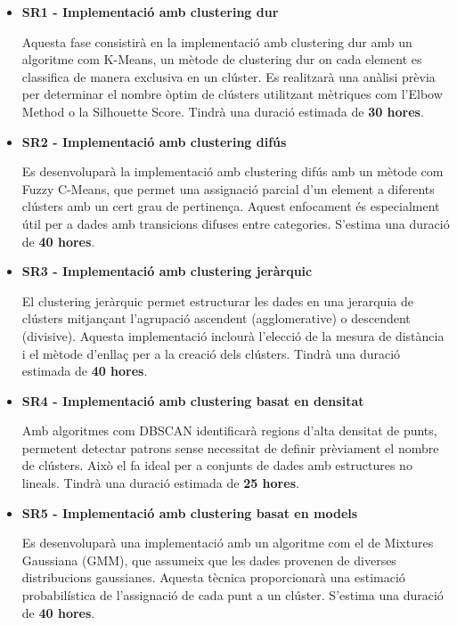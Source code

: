 \documentclass[a4paper,12pt]{report}
\begin{document}
\begin{itemize}
    \item \textbf{SR1 - Implementació amb clustering dur}
    
    Aquesta fase consistirà en la implementació amb clustering dur amb un algoritme com K-Means, un mètode de clustering dur on cada element es classifica de manera exclusiva en un clúster.
    Es realitzarà una anàlisi prèvia per determinar el nombre òptim de clústers utilitzant mètriques com l'Elbow Method o la Silhouette Score.
    Tindrà una duració estimada de \textbf{30 hores}.

    \item \textbf{SR2 - Implementació amb clustering difús}
    
    Es desenvoluparà la implementació amb clustering difús amb un mètode com Fuzzy C-Means, que permet una assignació parcial d'un element a diferents clústers amb un cert grau de pertinença.
    Aquest enfocament és especialment útil per a dades amb transicions difuses entre categories.
    S'estima una duració de \textbf{40 hores}.

    \item \textbf{SR3 - Implementació amb clustering jeràrquic}
    
    El clustering jeràrquic permet estructurar les dades en una jerarquia de clústers mitjançant l'agrupació ascendent (agglomerative) o descendent (divisive).
    Aquesta implementació inclourà l'elecció de la mesura de distància i el mètode d'enllaç per a la creació dels clústers.
    Tindrà una duració estimada de \textbf{40 hores}.

    \item \textbf{SR4 - Implementació amb clustering basat en densitat}
    
    Amb algoritmes com DBSCAN identificarà regions d'alta densitat de punts, permetent detectar patrons sense necessitat de definir prèviament el nombre de clústers.
    Això el fa ideal per a conjunts de dades amb estructures no lineals.
    Tindrà una duració estimada de \textbf{25 hores}.

    \item \textbf{SR5 - Implementació amb clustering basat en models}
    
    Es desenvoluparà una implementació amb un algoritme com el de Mixtures Gaussiana (GMM), que assumeix que les dades provenen de diverses distribucions gaussianes.
    Aquesta tècnica proporcionarà una estimació probabilística de l'assignació de cada punt a un clúster.
    S'estima una duració de \textbf{40 hores}.
\end{itemize}
\end{document}
